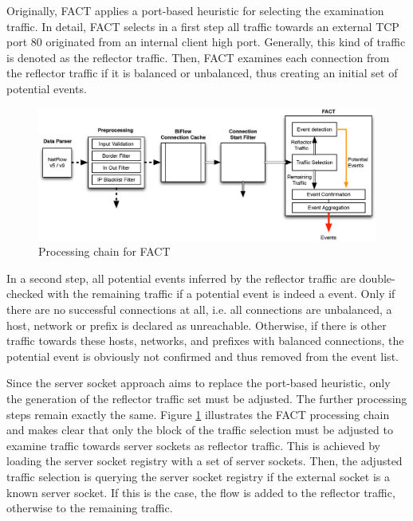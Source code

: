 Originally, \gls{FACT} applies a port-based heuristic for selecting the  examination traffic.  
In detail, \gls{FACT} selects in a first step all traffic towards an external  \gls{TCP} port 80 originated from an internal client high port. 
Generally, this kind of traffic is denoted as the reflector traffic. 
Then, \gls{FACT} examines each connection from the reflector traffic if it is  balanced or unbalanced, thus creating an initial set of potential events. 

\begin{figure}
	[!b] \centering
	\includegraphics[width=\linewidth]{images/FACT.eps}
	\caption{Processing chain for FACT} 
	\label{fig:fact_chain} 
\end{figure}

In a second step, all potential events inferred by the reflector traffic are  double-checked with the remaining traffic if a potential event is indeed a  event. 
Only if there are no successful connections at all, i.e. all connections  are unbalanced, a host, network or prefix is declared as unreachable. 
Otherwise, if there is other traffic towards these hosts, networks, and prefixes with balanced connections, the potential event is obviously not confirmed and thus removed from the event list. 

Since the \gls{server socket} approach aims to replace the port-based heuristic,  only the generation of the reflector traffic set must be adjusted. 
The further processing steps remain exactly the same. 
Figure \ref{fig:fact_chain} illustrates the \gls{FACT} processing chain and makes clear that only the block of the traffic selection must be adjusted to examine traffic towards \glspl{server socket} as reflector traffic. 
This is achieved by loading the \gls{server socket} registry with a set of \glspl{server socket}. 
Then, the adjusted traffic selection is querying the server socket registry if the external socket is a known \gls{server socket}. 
If this is the case, the flow is added to the reflector traffic, otherwise to the remaining traffic. 

